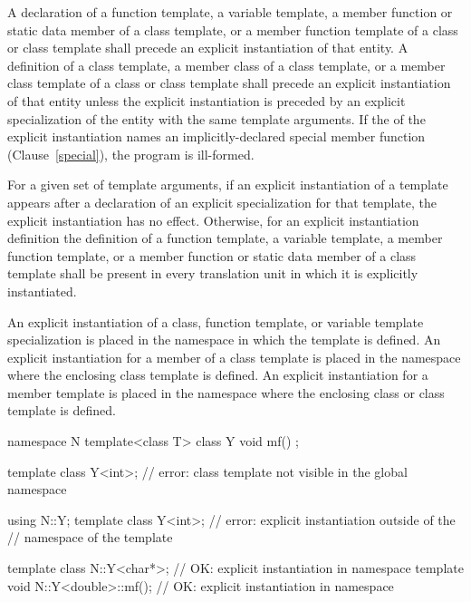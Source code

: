 \pnum
A declaration of a function template, a variable template, a member function
or static data member
of a class template, or a member function template of a class or class
template shall precede an explicit instantiation of that entity. A definition
of a class template, a member class of a class template, or a member class
template of a class or class template shall precede an explicit instantiation
of that entity unless the explicit instantiation is preceded by an explicit
specialization of the entity with the same template arguments.
If the
of the explicit instantiation names an implicitly-declared special member
function (Clause~\ref{special}), the program is ill-formed.

\pnum
For a given set of template arguments, if an explicit
instantiation of a template appears after a declaration of
an explicit specialization for that template, the explicit
instantiation has no effect. Otherwise, for an explicit instantiation
definition the definition of a
function template, a variable template, a member
function template, or a member function or static
data member of a class template shall be present in every
translation unit in which it is explicitly instantiated.

\pnum
An explicit instantiation of a class, function template, or variable template
specialization is
placed in the namespace in which the template is defined.
An explicit instantiation for a member of a class template is placed in
the namespace where the enclosing class template is defined.
An explicit instantiation for a member template is placed in the namespace
where the enclosing class or class template is defined.
\begin{example}

\begin{codeblock}
namespace N {
  template<class T> class Y { void mf() { } };
}

template class Y<int>;                  // error: class template  not visible in the global namespace

using N::Y;
template class Y<int>;                  // error: explicit instantiation outside of the
                                        // namespace of the template

template class N::Y<char*>;             // OK: explicit instantiation in namespace 
template void N::Y<double>::mf();       // OK: explicit instantiation in namespace 
\end{codeblock}
\end{example}

